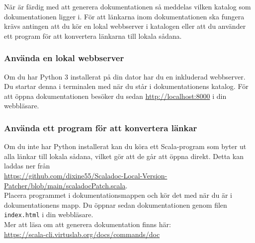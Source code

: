 När  är färdig med att generera dokumentationen så meddelas vilken katalog som dokumentationen ligger i. För att länkarna inom dokumentationen ska fungera krävs antingen att du kör en lokal webbserver i katalogen eller att du använder ett program för att konvertera länkarna till lokala sådana.

\subsubsection{Använda en lokal webbserver}
Om du har Python 3 installerat på din dator har du en inkluderad webbserver. Du startar denna i terminalen med  när du står i dokumentationens katalog. För att öppna dokumentationen besöker du sedan \url{http://localhost:8000} i din webbläsare.

\subsubsection{Använda ett program för att konvertera länkar}
Om du inte har Python installerat kan du köra ett Scala-program som byter ut alla länkar till lokala sådana, vilket gör att de går att öppna direkt. Detta kan laddas ner från \\
\url{https://github.com/dixine55/Scaladoc-Local-Version-Patcher/blob/main/scaladocPatch.scala}. \\
Placera programmet i dokumentationsmappen och kör det med  när du är i dokumentationens mapp. Du öppnar sedan dokumentationen genom filen \texttt{index.html} i din webbläsare. \\

Mer att läsa om att generera dokumentation finns här: \\
\url{https://scala-cli.virtuslab.org/docs/commands/doc}




